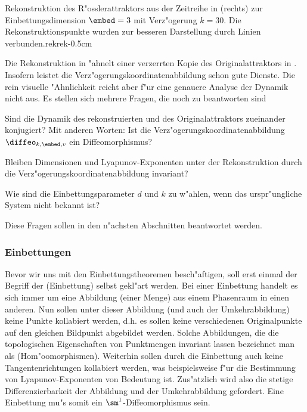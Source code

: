 {
{Rekonstruktion des R"osslerattraktors aus der Zeitreihe in  (rechts) zur
  Einbettungsdimension $\embed=3$ mit Verz"ogerung $k=30$. Die Rekonstruktionspunkte
  wurden zur besseren Darstellung durch Linien verbunden.}{rekrek}{-0.5cm}}

Die Rekonstruktion in  "ahnelt einer verzerrten Kopie des
Originalattraktors in . Insofern leistet die
Verz"ogerungskoordinatenabbildung schon gute Dienste. Die rein visuelle "Ahnlichkeit
reicht aber f"ur eine genauere Analyse der Dynamik nicht aus. Es stellen sich mehrere
Fragen, die noch zu beantworten sind
\begin{myitemize}
\item Sind die Dynamik des rekonstruierten und des Originalattraktors zueinander
konjugiert? Mit anderen Worten: Ist die Verz"ogerungskoordinatenabbildung $\diffeo_{k,\embed,v}$
ein Diffeomorphismus?
\item Bleiben Dimensionen und Lyapunov-Exponenten unter der Rekonstruktion durch 
die Verz"ogerungskoordinatenabbildung invariant?
\item Wie sind die Einbettungsparameter $d$ und $k$ zu w"ahlen, wenn das urspr"ungliche
System nicht bekannt ist?
\end{myitemize}
Diese Fragen sollen in den n"achsten Abschnitten beantwortet werden.





\subsubsection{Einbettungen}

Bevor wir uns mit den Einbettungstheoremen besch"aftigen, soll erst einmal der Begriff der
\begriff(Einbettung) selbst gekl"art werden. Bei einer Einbettung handelt es sich immer um
eine Abbildung (einer Menge) aus einem Phasenraum in einen anderen. Nun sollen unter
dieser Abbildung (und auch der Umkehrabbildung) keine Punkte kollabiert werden, d.h. es
sollen keine verschiedenen Originalpunkte auf den gleichen Bildpunkt abgebildet werden.
Solche Abbildungen, die die topologischen Eigenschaften von Punktmengen invariant lassen
bezeichnet man als \begriff(Hom"oomorphismen). Weiterhin sollen durch die Einbettung auch
keine Tangentenrichtungen kollabiert werden, was beispielsweise f"ur die Bestimmung von
Lyapunov-Exponenten von Bedeutung ist.  Zus"atzlich wird also die stetige
Differenzierbarkeit der Abbildung und der Umkehrabbildung gefordert. Eine
Einbettung mu"s somit ein $\sm^1$-Diffeomorphismus sein.

